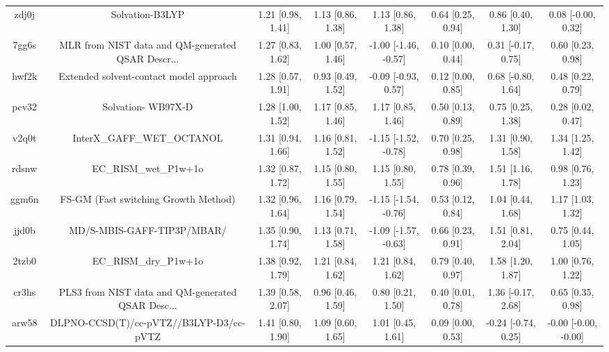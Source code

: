 \documentclass{article}
\begin{document}
\begin{center}
\begin{longtable}{|cccccccc|}
 zdj0j &                                    Solvation-B3LYP &  1.21 [0.98, 1.41] &  1.13 [0.86, 1.38] &     1.13 [0.86, 1.38] &  0.64 [0.25, 0.94] &    0.86 [0.40, 1.30] &    0.08 [-0.00, 0.32] \\
 7gg6s &  MLR from NIST data and QM-generated QSAR Descr... &  1.27 [0.83, 1.62] &  1.00 [0.57, 1.46] &  -1.00 [-1.46, -0.57] &  0.10 [0.00, 0.44] &   0.31 [-0.17, 0.75] &     0.60 [0.23, 0.98] \\
 hwf2k &            Extended solvent-contact model approach &  1.28 [0.57, 1.91] &  0.93 [0.49, 1.52] &   -0.09 [-0.93, 0.57] &  0.12 [0.00, 0.85] &   0.68 [-0.80, 1.64] &     0.48 [0.22, 0.79] \\
 pcv32 &                                 Solvation- WB97X-D &  1.28 [1.00, 1.52] &  1.17 [0.85, 1.46] &     1.17 [0.85, 1.46] &  0.50 [0.13, 0.89] &    0.75 [0.25, 1.38] &     0.28 [0.02, 0.47] \\
 v2q0t &                         InterX\_GAFF\_WET\_OCTANOL &  1.31 [0.94, 1.66] &  1.16 [0.81, 1.52] &  -1.15 [-1.52, -0.78] &  0.70 [0.25, 0.98] &    1.31 [0.90, 1.58] &     1.34 [1.25, 1.42] \\
 rdsnw &                              EC\_RISM\_wet\_P1w+1o &  1.32 [0.87, 1.72] &  1.15 [0.80, 1.55] &     1.15 [0.80, 1.55] &  0.78 [0.39, 0.96] &    1.51 [1.16, 1.78] &     0.98 [0.76, 1.23] \\
 ggm6n &               FS-GM (Fast switching Growth Method) &  1.32 [0.96, 1.64] &  1.16 [0.79, 1.54] &  -1.15 [-1.54, -0.76] &  0.53 [0.12, 0.84] &    1.04 [0.44, 1.68] &     1.17 [1.03, 1.32] \\
 jjd0b &                         MD/S-MBIS-GAFF-TIP3P/MBAR/ &  1.35 [0.90, 1.74] &  1.13 [0.71, 1.58] &  -1.09 [-1.57, -0.63] &  0.66 [0.23, 0.91] &    1.51 [0.81, 2.04] &     0.75 [0.44, 1.05] \\
 2tzb0 &                              EC\_RISM\_dry\_P1w+1o &  1.38 [0.92, 1.79] &  1.21 [0.84, 1.62] &     1.21 [0.84, 1.62] &  0.79 [0.40, 0.97] &    1.58 [1.20, 1.87] &     1.00 [0.76, 1.22] \\
 cr3hs &  PLS3 from NIST data and QM-generated QSAR Desc... &  1.39 [0.58, 2.07] &  0.96 [0.46, 1.59] &     0.80 [0.21, 1.50] &  0.40 [0.01, 0.78] &   1.36 [-0.17, 2.68] &     0.65 [0.35, 0.98] \\
 arw58 &            DLPNO-CCSD(T)/cc-pVTZ//B3LYP-D3/cc-pVTZ &  1.41 [0.80, 1.90] &  1.09 [0.60, 1.65] &     1.01 [0.45, 1.61] &  0.09 [0.00, 0.53] &  -0.24 [-0.74, 0.25] &  -0.00 [-0.00, -0.00] \\

\end{longtable}
\end{center}
\end{document}
